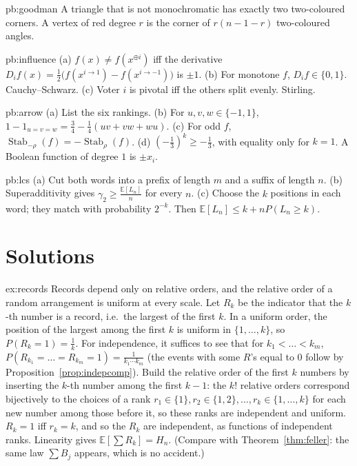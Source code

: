 \begin{hint}{pb:goodman}
A triangle that is not monochromatic has exactly two two-coloured corners. A vertex of red degree $r$ is the corner of
$r(n-1-r)$ two-coloured angles.
\end{hint}

\begin{hint}{pb:influence}
(a) $f(x)\ne f(x^{\oplus i})$ iff the derivative $D_if(x)=\frac12\bigl(f(x^{i\to1})-f(x^{i\to-1})\bigr)$ is $\pm1$. (b) For monotone $f$, $D_if\in\{0,1\}$.
Cauchy--Schwarz. (c) Voter $i$ is pivotal iff the others split evenly. Stirling.
\end{hint}

\begin{hint}{pb:arrow}
(a) List the six rankings. (b) For $u,v,w\in\{-1,1\}$, $1-1_{u=v=w}=\frac34-\frac14(uv+vw+wu)$. (c) For odd $f$, $\operatorname{Stab}_{-\rho}(f)=-\operatorname{Stab}_\rho(f)$.
(d) $(-\frac13)^k\ge-\frac13$, with equality only for $k=1$. A Boolean function of degree $1$ is $\pm x_i$.
\end{hint}

\begin{hint}{pb:lcs}
(a) Cut both words into a prefix of length $m$ and a suffix of length $n$. (b) Superadditivity gives $\gamma_2\ge\frac{\mathbb E[L_n]}n$ for every $n$. (c) Choose the $k$ positions in each word;
they match with probability $2^{-k}$. Then $\mathbb E[L_n]\le k+nP(L_n\ge k)$.
\end{hint}

\section{Solutions}

\begin{solution}{ex:records}
\idea Records depend only on relative orders, and the relative order of a random arrangement is uniform at every
scale.
\writeup Let $R_k$ be the indicator that the $k$-th number is a record, i.e.\ the largest of the first $k$. In a uniform
order, the position of the largest among the first $k$ is uniform in $\{1,\dots,k\}$, so $P(R_k=1)=\frac1k$. For
independence, it suffices to see that for $k_1<\dots<k_m$, $P(R_{k_1}=\dots=R_{k_m}=1)=\frac1{k_1\cdots k_m}$ (the events
with some $R$'s equal to $0$ follow by Proposition~\ref{prop:indepcomp}). Build the relative order of the first $k$
numbers by inserting the $k$-th number among the first $k-1$: the $k!$ relative orders correspond bijectively to
the choices of a rank $r_1\in\{1\},r_2\in\{1,2\},\dots,r_k\in\{1,\dots,k\}$ for each new number among those before it, so
these ranks are independent and uniform. $R_k=1$ iff $r_k=k$, and so the $R_k$ are independent, as functions of
independent ranks. Linearity gives $\mathbb E[\sum R_k]=H_n$. (Compare with Theorem~\ref{thm:feller}: the same law $\sum B_j$
appears, which is no accident.)
\end{solution}

